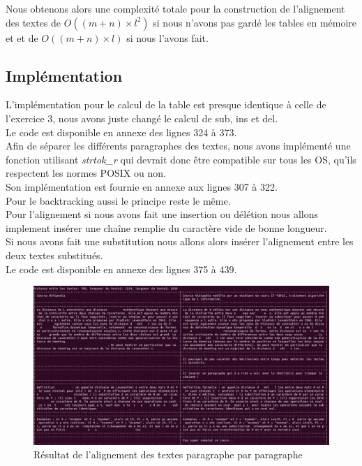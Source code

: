 \documentclass{article}
\begin{document}
Nous obtenons alors une complexité totale pour la construction de l'alignement 
des textes de $O((m+n)\times l^2)$ si nous n'avons pas gardé les tables en
mémoire et et de $O((m+n)\times l)$ si nous l'avons fait.


\subsection{Implémentation}

L'implémentation pour le calcul de la table est presque identique à celle de
l'exercice 3, nous avons juste changé le calcul de sub, ins et del.\\
Le code est disponible en annexe des lignes 324 à 373.\\
Afin de séparer les différents paragraphes des textes, nous avons implémenté
une fonction utilisant \textit{strtok\_r} qui devrait donc être compatible sur tous les
OS, qu'ils respectent les normes POSIX ou non.\\
Son implémentation est fournie en annexe aux lignes 307 à 322.\\

Pour le backtracking aussi le principe reste le même.\\
Pour l'alignement si nous avons fait une insertion ou délétion nous allons
implement insérer une chaîne remplie du caractère vide de bonne longueur.\\
Si nous avons fait une substitution nous allons alors insérer l'alignement
entre les deux textes substitués.\\
Le code est disponible en annexe des lignes 375 à 439.\\

\begin{figure}[!hbt]
	\centering
	\includegraphics[width=0.95\linewidth]{./images/exo4.png}
	\caption{Résultat de l'alignement des textes paragraphe par paragraphe}%
	\label{fig:exo4}
\end{figure}
\end{document}
